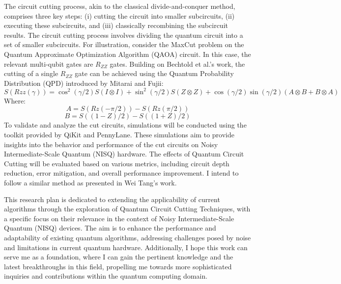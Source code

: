 \documentclass[]{article}
\begin{document}
The circuit cutting process, akin to the classical divide-and-conquer method, comprises three key steps: (i) cutting the circuit into smaller subcircuits, (ii) executing these subcircuits, and (iii) classically recombining the subcircuit results. The circuit cutting process involves dividing the quantum circuit into a set of smaller subcircuits. For illustration, consider the MaxCut problem on the Quantum Approximate Optimization Algorithm (QAOA) circuit. In this case, the relevant multi-qubit gates are $R_{ZZ}$ gates. Building on Bechtold et al.'s work\cite{Bechtold_2023}, the cutting of a single $R_{ZZ}$ gate can be achieved using the Quantum Probability Distribution (QPD) introduced by Mitarai and Fujii\cite{Mitarai_2021}:
$$S(Rzz(\gamma)) = \cos^2(\gamma/2) S(I \otimes I) + \sin^2(\gamma/2) S(Z \otimes Z) + \cos(\gamma/2) \sin(\gamma/2)(A \otimes B + B \otimes A)$$
Where:
$$A = S(Rz(-\pi/2)) - S(Rz(\pi/2))$$
$$B = S((1-Z)/2) - S((1+Z)/2)$$
To validate and analyze the cut circuits, simulations will be conducted using the toolkit provided by QiKit and PennyLane. These simulations aim to provide insights into the behavior and performance of the cut circuits on Noisy Intermediate-Scale Quantum (NISQ) hardware. The effects of Quantum Circuit Cutting will be evaluated based on various metrics, including circuit depth reduction, error mitigation, and overall performance improvement. I intend to follow a similar method as presented in Wei Tang's work\cite{CutQC}.

This research plan is dedicated to extending the applicability of current algorithms through the exploration of Quantum Circuit Cutting Techniques, with a specific focus on their relevance in the context of Noisy Intermediate-Scale Quantum (NISQ) devices. The aim is to enhance the performance and adaptability of existing quantum algorithms, addressing challenges posed by noise and limitations in current quantum hardware. Additionally, I hope this work can serve me as a foundation, where I can gain the pertinent knowledge and the latest breakthroughs in this field, propelling me towards more sophisticated inquiries and contributions within the quantum computing domain.




\end{document}
